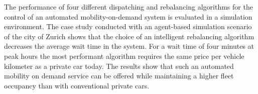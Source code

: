 The performance of four different dispatching and rebalancing algorithms for the
control of an automated mobility-on-demand system is evaluated in a simulation environment.
The case study conducted with an agent-based simulation scenario of the city of Zurich
shows that the choice of an intelligent rebalancing algorithm decreases the average
 wait time in the system. For a wait time of four minutes at peak hours the most performant algorithm requires the same price
per vehicle kilometer as a private car today.
The results show that such an automated mobility on demand service can be offered
while maintaining a higher fleet occupancy than with conventional private cars.
